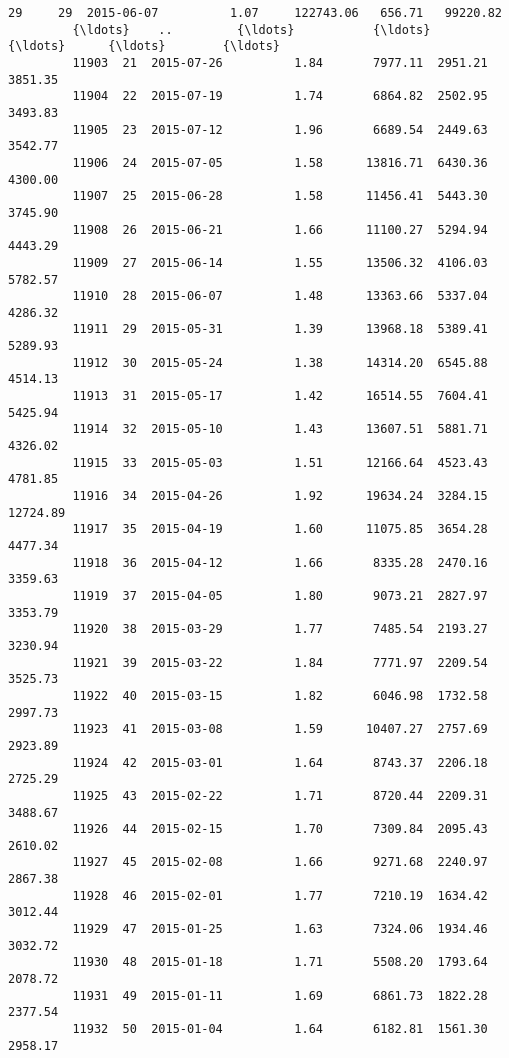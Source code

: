 \documentclass[11pt]{article}
\begin{document}
\begin{Verbatim}[commandchars=\\\{\}]
         29     29  2015-06-07          1.07     122743.06   656.71   99220.82   
         {\ldots}    ..         {\ldots}           {\ldots}           {\ldots}      {\ldots}        {\ldots}   
         11903  21  2015-07-26          1.84       7977.11  2951.21    3851.35   
         11904  22  2015-07-19          1.74       6864.82  2502.95    3493.83   
         11905  23  2015-07-12          1.96       6689.54  2449.63    3542.77   
         11906  24  2015-07-05          1.58      13816.71  6430.36    4300.00   
         11907  25  2015-06-28          1.58      11456.41  5443.30    3745.90   
         11908  26  2015-06-21          1.66      11100.27  5294.94    4443.29   
         11909  27  2015-06-14          1.55      13506.32  4106.03    5782.57   
         11910  28  2015-06-07          1.48      13363.66  5337.04    4286.32   
         11911  29  2015-05-31          1.39      13968.18  5389.41    5289.93   
         11912  30  2015-05-24          1.38      14314.20  6545.88    4514.13   
         11913  31  2015-05-17          1.42      16514.55  7604.41    5425.94   
         11914  32  2015-05-10          1.43      13607.51  5881.71    4326.02   
         11915  33  2015-05-03          1.51      12166.64  4523.43    4781.85   
         11916  34  2015-04-26          1.92      19634.24  3284.15   12724.89   
         11917  35  2015-04-19          1.60      11075.85  3654.28    4477.34   
         11918  36  2015-04-12          1.66       8335.28  2470.16    3359.63   
         11919  37  2015-04-05          1.80       9073.21  2827.97    3353.79   
         11920  38  2015-03-29          1.77       7485.54  2193.27    3230.94   
         11921  39  2015-03-22          1.84       7771.97  2209.54    3525.73   
         11922  40  2015-03-15          1.82       6046.98  1732.58    2997.73   
         11923  41  2015-03-08          1.59      10407.27  2757.69    2923.89   
         11924  42  2015-03-01          1.64       8743.37  2206.18    2725.29   
         11925  43  2015-02-22          1.71       8720.44  2209.31    3488.67   
         11926  44  2015-02-15          1.70       7309.84  2095.43    2610.02   
         11927  45  2015-02-08          1.66       9271.68  2240.97    2867.38   
         11928  46  2015-02-01          1.77       7210.19  1634.42    3012.44   
         11929  47  2015-01-25          1.63       7324.06  1934.46    3032.72   
         11930  48  2015-01-18          1.71       5508.20  1793.64    2078.72   
         11931  49  2015-01-11          1.69       6861.73  1822.28    2377.54   
         11932  50  2015-01-04          1.64       6182.81  1561.30    2958.17   
         

\end{Verbatim}
\end{document}
